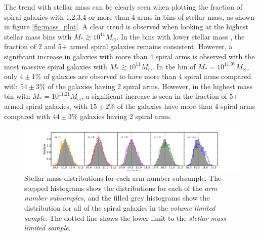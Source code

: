 \documentclass[useAMS,usenatbib]{mn2e}
\begin{document}
The trend with stellar mass can be clearly seen when plotting the fraction of spiral galaxies with 1,2,3,4 or more than 4 arms in bins of stellar mass, as shown in figure \ref{fig:mass_plot}. A clear trend is observed when looking at the highest stellar mass bins with $M_* \gtrsim 10^{11} M_{\odot}$. In the bins with lower stellar mass , the fraction of 2 and 5+ armed spiral galaxies remains consistent. However, a significant increase in galaxies with more than 4 spiral arms is observed with the most massive spiral galaxies with $M_* \gtrsim 10^{11} M_{\odot}$. In the bin of $M_* = 10^{11.97}M_{\odot}$, only $4 \pm 1 \%$ of galaxies are observed to have more than 4 spiral arms compared with $54 \pm 3 \%$ of the galaxies having 2 spiral arms. However, in the highest mass bin with $M_* = 10^{11.21}M_{\odot}$, a significant increase is seen in the fraction of 5+ armed spiral galaxies, with $15 \pm 2 \%$ of the galaxies have more than 4 spiral arms compared with $44 \pm 3 \%$ galaxies having 2 spiral arms.

\begin{figure}
		\centering
		
        \includegraphics[width=1\textwidth]{Results_imgs/mass_histogram.pdf}
		
        \caption{Stellar mass distributions for each arm number subsample. The stepped histograms show the distributions for each of the \textit{arm number subsamples}, and the filled grey histograms show the distribution for all of the spiral galaxies in the \textit{volume limited sample}. The dotted line shows the lower limit to the \textit{stellar mass limited sample}.}
		
        \label{fig:mass_histogram}
        
\end{figure}
\end{document}
